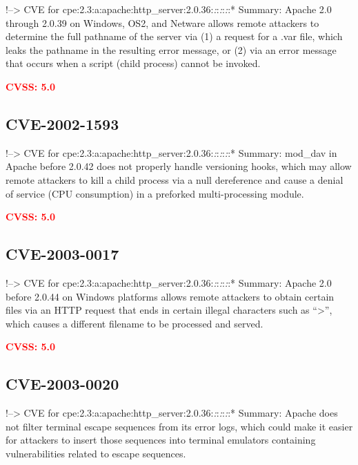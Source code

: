 \documentclass[a4paper, 12pt]{article}
\begin{document}
!--\textgreater{} CVE for
cpe:2.3:a:apache:http\_server:2.0.36:\emph{:}:\emph{:}:\emph{:}:*
Summary: Apache 2.0 through 2.0.39 on Windows, OS2, and Netware allows
remote attackers to determine the full pathname of the server via (1) a
request for a .var file, which leaks the pathname in the resulting error
message, or (2) via an error message that occurs when a script (child
process) cannot be invoked.

\textbf{\textcolor{red}{CVSS: 5.0}}

\hypertarget{cve-2002-1593}{%
\subsection{CVE-2002-1593}\label{cve-2002-1593}}

!--\textgreater{} CVE for
cpe:2.3:a:apache:http\_server:2.0.36:\emph{:}:\emph{:}:\emph{:}:*
Summary: mod\_dav in Apache before 2.0.42 does not properly handle
versioning hooks, which may allow remote attackers to kill a child
process via a null dereference and cause a denial of service (CPU
consumption) in a preforked multi-processing module.

\textbf{\textcolor{red}{CVSS: 5.0}}

\hypertarget{cve-2003-0017}{%
\subsection{CVE-2003-0017}\label{cve-2003-0017}}

!--\textgreater{} CVE for
cpe:2.3:a:apache:http\_server:2.0.36:\emph{:}:\emph{:}:\emph{:}:*
Summary: Apache 2.0 before 2.0.44 on Windows platforms allows remote
attackers to obtain certain files via an HTTP request that ends in
certain illegal characters such as ``\textgreater{}'', which causes a
different filename to be processed and served.

\textbf{\textcolor{red}{CVSS: 5.0}}

\hypertarget{cve-2003-0020}{%
\subsection{CVE-2003-0020}\label{cve-2003-0020}}

!--\textgreater{} CVE for
cpe:2.3:a:apache:http\_server:2.0.36:\emph{:}:\emph{:}:\emph{:}:*
Summary: Apache does not filter terminal escape sequences from its error
logs, which could make it easier for attackers to insert those sequences
into terminal emulators containing vulnerabilities related to escape
sequences.
\end{document}
